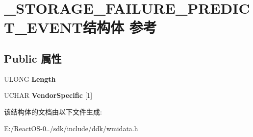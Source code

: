 \hypertarget{struct___s_t_o_r_a_g_e___f_a_i_l_u_r_e___p_r_e_d_i_c_t___e_v_e_n_t}{}\section{\+\_\+\+S\+T\+O\+R\+A\+G\+E\+\_\+\+F\+A\+I\+L\+U\+R\+E\+\_\+\+P\+R\+E\+D\+I\+C\+T\+\_\+\+E\+V\+E\+N\+T结构体 参考}
\label{struct___s_t_o_r_a_g_e___f_a_i_l_u_r_e___p_r_e_d_i_c_t___e_v_e_n_t}
\subsection*{Public 属性}
\begin{DoxyCompactItemize}
\item 
\mbox{\label{struct___s_t_o_r_a_g_e___f_a_i_l_u_r_e___p_r_e_d_i_c_t___e_v_e_n_t_a4c2a3cc4c4798412fd2e79e814f27834}} 
U\+L\+O\+NG {\bfseries Length}
\item 
\mbox{\label{struct___s_t_o_r_a_g_e___f_a_i_l_u_r_e___p_r_e_d_i_c_t___e_v_e_n_t_a97a6d08c2ed0c4683bf295e9bda24144}} 
U\+C\+H\+AR {\bfseries Vendor\+Specific} \mbox{[}1\mbox{]}
\end{DoxyCompactItemize}


该结构体的文档由以下文件生成\+:\begin{DoxyCompactItemize}
\item 
E\+:/\+React\+O\+S-\/0../sdk/include/ddk/wmidata.\+h\end{DoxyCompactItemize}
